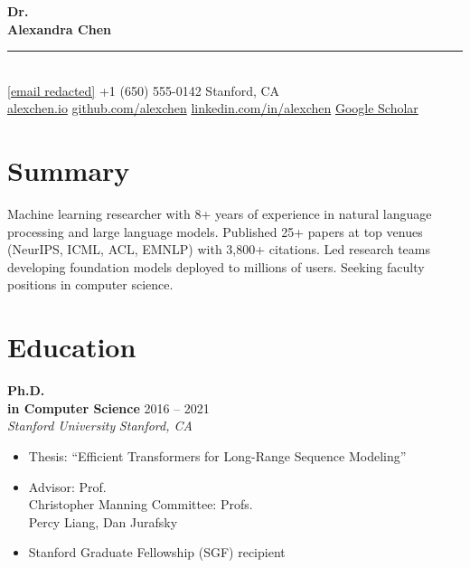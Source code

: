 \documentclass[11pt,a4paper]{article}
\newcommand{\cventry}[4]{%
  \textbf{#1} \hfill {\color{lightgray}#2}\\
  {\color{accent}\textit{#3}} \hfill {\color{lightgray}\textit{#4}}\\[2pt]
}
\begin{document}
\begin{center}
  {\fontsize{28}{34}\selectfont\bfseries\color{primary} Dr.\\ Alexandra Chen}\\[8pt]
  {\color{lightgray}\rule{8cm}{0.5pt}}\\[8pt]
  {\small
    \;\href{mailto:[email redacted]}{[email redacted]} \quad
    \;+1 (650) 555-0142 \quad
    \;Stanford, CA\\[4pt]
    \;\href{https://alexchen.io}{alexchen.io} \quad
    \;\href{https://github.com/alexchen}{github.com/alexchen} \quad
    \;\href{https://linkedin.com/in/alexchen}{linkedin.com/in/alexchen} \quad
    \;\href{https://scholar.google.com/citations?user=XXXXX}{Google Scholar}
  }
\end{center}

\vspace{4pt}

\section{Summary}

Machine learning researcher with 8+ years of experience in natural language processing and large language models. Published 25+ papers at top venues (NeurIPS, ICML, ACL, EMNLP) with 3,800+ citations. Led research teams developing foundation models deployed to millions of users. Seeking faculty positions in computer science.

\section{Education}

\cventry{Ph.D.\\ in Computer Science}{2016 -- 2021}{Stanford University}{Stanford, CA}
\begin{itemize}[leftmargin=1.5em, nosep, itemsep=2pt]
  \item Thesis: ``Efficient Transformers for Long-Range Sequence Modeling''
  \item Advisor: Prof.\\ Christopher Manning \quad Committee: Profs.\\ Percy Liang, Dan Jurafsky
  \item Stanford Graduate Fellowship (SGF) recipient
\end{itemize}
\end{document}
